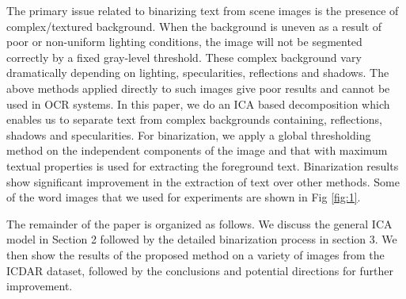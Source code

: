 The primary issue related to binarizing text from scene images is the presence of complex/textured background. 
When the background is uneven as a result of poor or non-uniform lighting conditions, the image will not be 
segmented correctly by a fixed gray-level threshold. These complex background vary dramatically depending on
lighting, specularities, reflections and shadows. The above methods applied directly to such images
give poor results and cannot be used in OCR systems. In this paper, 
we do an ICA based decomposition which enables us to separate text from complex backgrounds containing, reflections,
shadows and specularities. 
For binarization, we apply a global thresholding method on the independent components of the image
and that with maximum textual properties is used for extracting the foreground text. Binarization results show 
significant improvement in the extraction of text over other methods. Some of the word images that we used 
for experiments are shown in Fig \ref{fig:1}.

The remainder of the paper is organized as follows. We discuss the general ICA model in Section 2 followed by
the detailed binarization process in section 3. We then show the results of the proposed method on a variety
of images from the ICDAR dataset, followed by the conclusions and potential directions for further improvement.

